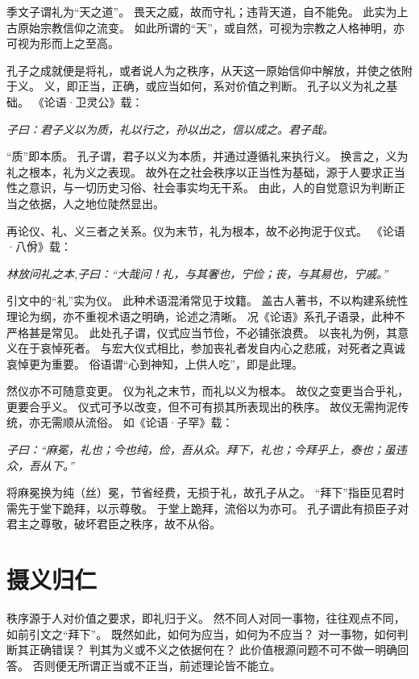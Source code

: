 \documentclass[11pt]{article}
\begin{document}
季文子谓礼为“天之道”。
畏天之威，故而守礼；违背天道，自不能免。
此实为上古原始宗教信仰之流变。
如此所谓的“天”，或自然，可视为宗教之人格神明，亦可视为形而上之至高。

\newline

孔子之成就便是将礼，或者说人为之秩序，从天这一原始信仰中解放，并使之依附于义。
义，即正当，正确，或应当如何，系对价值之判断。
孔子以义为礼之基础。
《论语·卫灵公》载：

\textit{子曰：君子义以为质，礼以行之，孙以出之，信以成之。君子哉。}

“质”即本质。
孔子谓，君子以义为本质，并通过遵循礼来执行义。
换言之，义为礼之根本，礼为义之表现。
故外在之社会秩序以正当性为基础，源于人要求正当性之意识，与一切历史习俗、社会事实均无干系。
由此，人的自觉意识为判断正当之依据，人之地位陡然显出。

\newline

再论仪、礼、义三者之关系。仪为末节，礼为根本，故不必拘泥于仪式。
《论语·八佾》载：

\textit{林放问礼之本,子曰：“大哉问！礼，与其奢也，宁俭；丧，与其易也，宁戚。”}

引文中的“礼”实为仪。
此种术语混淆常见于坟籍。
盖古人著书，不以构建系统性理论为纲，亦不重视术语之明确，论述之清晰。
况《论语》系孔子语录，此种不严格甚是常见。
此处孔子谓，仪式应当节俭，不必铺张浪费。
以丧礼为例，其意义在于哀悼死者。
与宏大仪式相比，参加丧礼者发自内心之悲戚，对死者之真诚哀悼更为重要。
俗语谓“心到神知，上供人吃”，即是此理。

\newline

然仪亦不可随意变更。
仪为礼之末节，而礼以义为根本。
故仪之变更当合乎礼，更要合乎义。
仪式可予以改变，但不可有损其所表现出的秩序。
故仪无需拘泥传统，亦无需顺从流俗。
如《论语·子罕》载：

\textit{子曰：“麻冕，礼也；今也纯，俭，吾从众。拜下，礼也；今拜乎上，泰也；虽违众，吾从下。”}

将麻冕换为纯（丝）冕，节省经费，无损于礼，故孔子从之。
“拜下”指臣见君时需先于堂下跪拜，以示尊敬。
于堂上跪拜，流俗以为亦可。
孔子谓此有损臣子对君主之尊敬，破坏君臣之秩序，故不从俗。

\newline

\section{摄义归仁}
秩序源于人对价值之要求，即礼归于义。
然不同人对同一事物，往往观点不同，如前引文之“拜下”。
既然如此，如何为应当，如何为不应当？
对一事物，如何判断其正确错误？
判其为义或不义之依据何在？
此价值根源问题不可不做一明确回答。
否则便无所谓正当或不正当，前述理论皆不能立。
\end{document}
